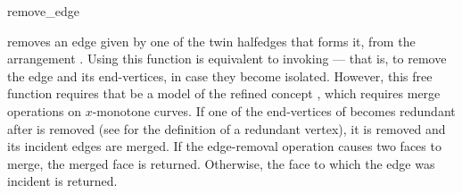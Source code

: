 
\ccRefPageBegin

\begin{ccRefFunction}{remove_edge}


   {removes an edge given by one of the twin halfedges  that forms it,
    from the arrangement . Using this function is equivalent to
    invoking  --- that is, to remove the
    edge and its end-vertices, in case they become isolated. However, this
    free function requires that  be a model of the refined concept
    , which requires merge operations
    on $x$-monotone curves. If one of the end-vertices of  becomes
    redundant after  is removed (see  for the
    definition of a redundant vertex), it is removed and its
    incident edges are merged.
    If the edge-removal operation causes two faces to merge, the merged face
    is returned. Otherwise, the face to which the edge was incident is
    returned.}

\end{ccRefFunction}

\ccRefPageEnd
